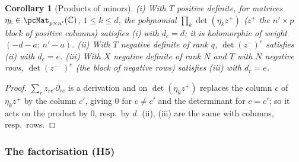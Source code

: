 \documentclass[10pt]{amsart}
\newtheorem{corollary}[theorem]{Corollary}
\theoremstyle{definition}
\theoremstyle{remark}
\newcommand{\C}{\mathbb C}
\begin{document}
\begin{corollary}[Products of minors]\label{pss:minors}
\textup{(i)} With $T$ positive definite, for matrices
$\eta_k\in\pcMat_{p\times n'}(\C)$, $1\le k\le d$, the polynomial $\prod_k\det(\eta_kz^+)$ \textup($z^+$ the
$n'\times p$ block of positive columns\textup) satisfies (i) with $d_c=d$; it is holomorphic of weight
$(-d-a;\,n'-a)$. \textup{(ii)} With $T$ negative definite of rank $q$, $\det(z^-)^e$ satisfies (ii) with
$d_c=e$. \textup{(iii)} With $X$ negative definite of rank $N$ and $T$ with $N$ negative rows,
$\det(z^{-\cdot})^e$ \textup(the block of negative rows\textup) satisfies (iii) with $d_r=e$.
\end{corollary}
\begin{proof}
$\sum_rz_{rc'}\partial_{rc}$ is a derivation and on $\det(\eta_kz^+)$ replaces the column $c$ of $\eta_kz^+$ by the
column $c'$, giving $0$ for $c\ne c'$ and the determinant for $c=c'$; so it acts on the product by $0$, resp.\
by $d$. (ii), (iii) are the same with columns, resp.\ rows.
\end{proof}

\subsubsection{The factorisation (H5)}\label{pss:ss-H5}
\end{document}
